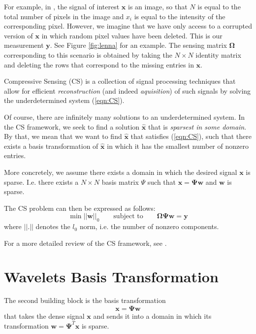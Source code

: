 \documentclass[final,3p]{report}
\let\bs\boldsymbol
\begin{document}
For example, in \cite{pilikos2014}, the signal of interest $\bs x$ is an image, so that $N$ is equal to the total number of pixels in the image and $x_i$ is equal to the intensity of the corresponding pixel.
However, we imagine that we have only access to a corrupted version of $\bs x$ in which random pixel values have been deleted.
This is our measurement $\bs y$. See Figure \ref{fig:lenna} for an example.
The sensing matrix $\bs\Omega$ corresponding to this scenario is obtained by taking the $N\times N$ identity matrix and deleting the rows that correspond to the missing entries in $\bs x$.

Compressive Sensing (CS) is a collection of signal processing techniques that allow for efficient \emph{reconstruction} (and indeed \emph{aquisition}) of such signals by solving the underdetermined system (\ref{eqn:CS}).

Of course, there are infinitely many solutions to an underdetermined system.
In the CS framework, we seek to find a solution $\hat{\bs x}$ that is \emph{sparsest in some domain}.
By that, we mean that we want to find $\hat{\bs x}$ that satisfies (\ref{eqn:CS}), such that there exists a basis transformation of $\hat{\bs x}$ in which it has the smallest number of nonzero entries.

More concretely, we assume there exists a domain in which the desired signal $\bs x$ is sparse. 
I.e. there exists a $N\times N$ basis matrix $\Psi$ such that $\bs x = \bs\Psi \bs w$ and $\bs w$ is sparse.

The CS problem can then be expressed as follows:
\begin{equation}
\label{eqn:CSproblem}
\min||\bs w||_0 \qquad\mbox{subject to}\qquad \bs\Omega\bs\Psi\bs w = \bs y
\end{equation}
where $||.||$ denotes the $l_0$ norm, i.e. the number of nonzero components.

For a more detailed review of the CS framework, see \cite{candes2008}.

\section{Wavelets Basis Transformation}
The second building block is the basis transformation
\begin{equation}
\bs x = \bs \Psi \bs w
\end{equation}
that takes the dense signal $\bs x$ and sends it into a domain in which its transformation $\bs w = \bs \Psi^T \bs x$ is sparse.
\end{document}
